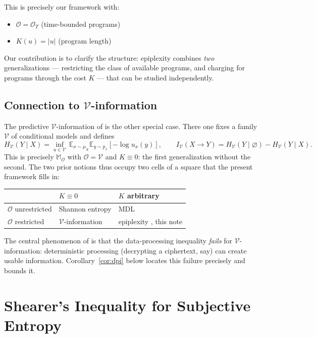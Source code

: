 \documentclass[11pt]{article}
\begin{document}
This is precisely our framework with:
\begin{itemize}
    \item $\mathcal{O} = \mathcal{O}_T$ (time-bounded programs)
    \item $K(u) = |u|$ (program length)
\end{itemize}

Our contribution is to clarify the structure: epiplexity combines \emph{two} generalizations
--- restricting the class of available programs, and charging for programs through the cost $K$ ---
that can be studied independently.

\subsection*{Connection to $\mathcal V$-information}

The predictive $\mathcal V$-information of \cite{xu2020} is the other special case. There one fixes a family $\mathcal V$ of conditional models and defines
\[ H_\mathcal{V}(Y \mid X) = \inf_{u \in \mathcal V}\, \mathbb E_{x \sim \mu_X}\mathbb E_{y \sim p_x}[-\log u_x(y)], \qquad I_\mathcal{V}(X \to Y) = H_\mathcal{V}(Y \mid \varnothing) - H_\mathcal{V}(Y \mid X). \]
This is precisely $\mathbb M_\mathcal{O}$ with $\mathcal O = \mathcal V$ and $K \equiv 0$: the first generalization without the second. The two prior notions thus occupy two cells of a square that the present framework fills in:

\begin{center}
\begin{tabular}{l|ll}
 & $K \equiv 0$ & $K$ arbitrary \\
\hline
$\mathcal O$ unrestricted & Shannon entropy & MDL \\
$\mathcal O$ restricted & $\mathcal V$-information \cite{xu2020} & epiplexity \cite{finzi2025}, this note \\
\end{tabular}
\end{center}

The central phenomenon of \cite{xu2020} is that the data-processing inequality \emph{fails} for $\mathcal V$-information: deterministic processing (decrypting a ciphertext, say) can create usable information. Corollary~\ref{cor:dpi} below locates this failure precisely and bounds it.


\section{Shearer's Inequality for Subjective Entropy}
\end{document}
